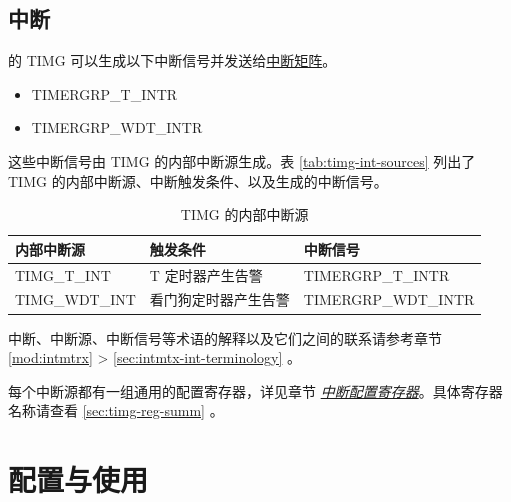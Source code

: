 \documentclass[main\_\_CN.tex]{subfiles}
\begin{document}

\subsection{中断}
\label{sec:timg-interrupt}

\chipname{} 的 TIMG 可以生成以下中断信号并发送给\hyperref[mod:intmtrx]{中断矩阵}。

    \begin{itemize}
        \item TIMERGRP\_T\_INTR
        \item TIMERGRP\_WDT\_INTR
    \end{itemize}

这些中断信号由 TIMG 的内部中断源生成。表 \ref{tab:timg-int-sources} 列出了 TIMG 的内部中断源、中断触发条件、以及生成的中断信号。


\begin{longtable}{ | L{5cm} | L{6.5cm} | L{4cm} | }
\caption{TIMG 的内部中断源} \label{tab:timg-int-sources}
\\ \hline
{}
\textbf{内部中断源} & \textbf{触发条件}  &  \textbf{中断信号}\\ \hline
\label{int:TIMGTxINT}TIMG\_T\_INT  &  T 定时器产生告警 &  TIMERGRP\_T\_INTR  \\ \hline
\label{int:TIMGWDTINT}TIMG\_WDT\_INT &  看门狗定时器产生告警 & TIMERGRP\_WDT\_INTR \\ \hline
\end{longtable}

\begin{tiplisting}
中断、中断源、中断信号等术语的解释以及它们之间的联系请参考章节 \ref{mod:intmtrx} \textit{} > \ref{sec:intmtx-int-terminology} \textit{}。
\end{tiplisting}

每个中断源都有一组通用的配置寄存器，详见章节 \hyperref[interrupt-config-registers]{\textit{中断配置寄存器}}。具体寄存器名称请查看 \ref{sec:timg-reg-summ} \textit{}。

\section{配置与使用}
\end{document}
